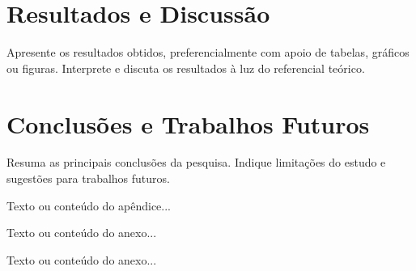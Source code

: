 \documentclass[a4paper,12pt]{article}
\begin{document}
\section{Resultados e Discussão}
Apresente os resultados obtidos, preferencialmente com apoio de tabelas, gráficos ou figuras.
Interprete e discuta os resultados à luz do referencial teórico.

\section{Conclusões e Trabalhos Futuros}
Resuma as principais conclusões da pesquisa.
Indique limitações do estudo e sugestões para trabalhos futuros.


Texto ou conteúdo do apêndice...

Texto ou conteúdo do anexo...

Texto ou conteúdo do anexo...

\end{document}
